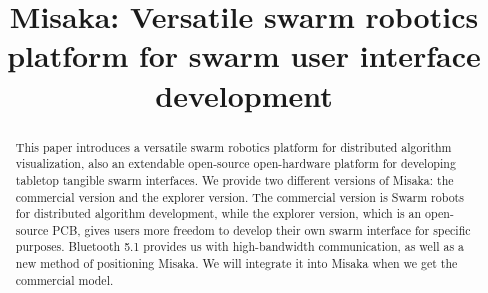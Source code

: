 \documentclass[sigconf]{acmart}
\begin{document}
\title{Misaka: Versatile swarm robotics platform for swarm user interface development}





\renewcommand{\shortauthors}{Tingliang and Haipeng}

\begin{abstract}
  This paper introduces a versatile swarm robotics platform for distributed algorithm visualization, also an extendable open-source open-hardware platform for developing tabletop tangible swarm interfaces. 
  We provide two different versions of Misaka: the commercial version and the explorer version. The commercial version is Swarm robots for distributed algorithm development, while the explorer version, which is an open-source PCB, gives users more freedom to develop their own swarm interface for specific purposes.
  Bluetooth 5.1 provides us with high-bandwidth communication, as well as a new method of positioning Misaka. We will integrate it into Misaka when we get the commercial model.


\end{abstract}
\end{document}
